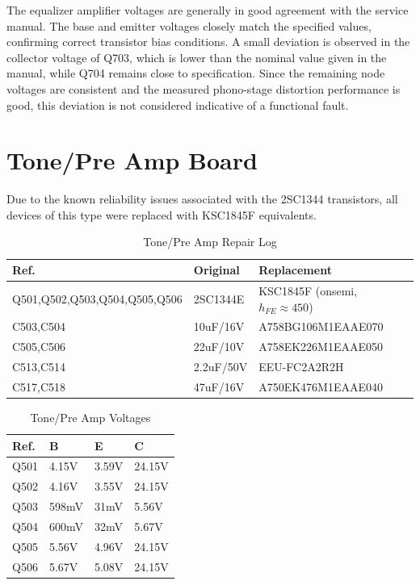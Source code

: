 \documentclass[]{article}
\begin{document}
The equalizer amplifier voltages are generally in good agreement with the service manual. The base and emitter voltages closely match the specified values, confirming correct transistor bias conditions. A small deviation is observed in the collector voltage of Q703, which is lower than the nominal value given in the manual, while Q704 remains close to specification. Since the remaining node voltages are consistent and the measured phono-stage distortion performance is good, this deviation is not considered indicative of a functional fault.

\section{Tone/Pre Amp Board}

Due to the known reliability issues associated with the 2SC1344 transistors, all devices of this type were replaced with KSC1845F equivalents.

\begin{table}[H]
	\centering
	\caption{Tone/Pre Amp Repair Log}
	\label{tab:tone_amp_log}
	\begin{tabular}{|l|l|l|}
		\hline
		\textbf{Ref.} & \textbf{Original} & \textbf{Replacement} \\
		\hline
		Q501,Q502,Q503,Q504,Q505,Q506 & 2SC1344E & KSC1845F (onsemi, $h_{FE} \approx 450$) \\
        \hline
        C503,C504 & 10uF/16V & A758BG106M1EAAE070 \\
        \hline
        C505,C506 & 22uF/10V & A758EK226M1EAAE050 \\
        \hline
        C513,C514 & 2.2uF/50V & EEU-FC2A2R2H \\
        \hline
        C517,C518 & 47uF/16V & A750EK476M1EAAE040 \\
        \hline
	\end{tabular}
\end{table}

\begin{table}[H]
	\centering
	\caption{Tone/Pre Amp Voltages}
	\label{tab:tone_amp_voltages}
	\begin{tabular}{|l|l|l|l|}
    \hline
    \textbf{Ref.} & \textbf{B} & \textbf{E} & \textbf{C} \\
    \hline
    Q501 & 4.15V  & 3.59V & 24.15V  \\
    \hline
    Q502 & 4.16V  & 3.55V & 24.15V \\
    \hline
    Q503 & 598mV  & 31mV & 5.56V  \\
    \hline
    Q504 & 600mV  & 32mV & 5.67V \\
    \hline
    Q505 & 5.56V  & 4.96V & 24.15V \\
    \hline
    Q506 & 5.67V  & 5.08V & 24.15V \\
    \hline
	\end{tabular}
\end{table}
\end{document}
